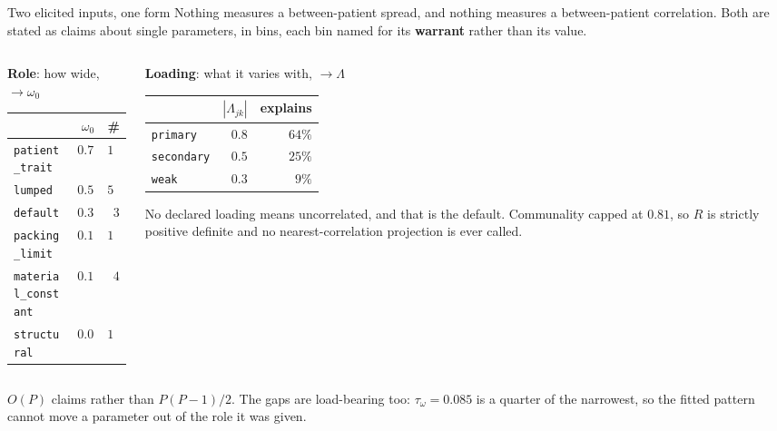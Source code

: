 \documentclass[10pt,aspectratio=169]{beamer}
\newcommand{\term}[1]{\alert{\textbf{#1}}}
\begin{document}
\begin{frame}[t]{Two elicited inputs, one form}
  Nothing measures a between-patient spread, and nothing measures a
  between-patient correlation. Both are stated as claims about single parameters,
  in bins, each bin named for its \term{warrant} rather than its value.
  \vspace{0.2em}
  \begin{columns}[t]
    \begin{column}{0.53\textwidth}
      {\small\textbf{Role}: how wide, $\to \omega_0$\par}
      \begin{center}\scriptsize
      \begin{tabular}{@{}lrr@{}}
        \toprule
        & $\omega_0$ & \# \\
        \midrule
        \texttt{patient\_trait} & $0.70$ & $18$ \\
        \texttt{lumped} & $0.50$ & $50$ \\
        \texttt{default} & $0.35$ & $3$ \\
        \texttt{packing\_limit} & $0.15$ & $12$ \\
        \texttt{material\_constant} & $0.10$ & $4$ \\
        \texttt{structural} & $0.05$ & $15$ \\
        \bottomrule
      \end{tabular}
      \end{center}
    \end{column}
    \begin{column}{0.43\textwidth}
      {\small\textbf{Loading}: what it varies with, $\to \Lambda$\par}
      \begin{center}\scriptsize
      \begin{tabular}{@{}lrr@{}}
        \toprule
        & $|\Lambda_{jk}|$ & explains \\
        \midrule
        \texttt{primary} & $0.8$ & $64\%$ \\
        \texttt{secondary} & $0.5$ & $25\%$ \\
        \texttt{weak} & $0.3$ & $9\%$ \\
        \bottomrule
      \end{tabular}
      \end{center}
      {\scriptsize No declared loading means uncorrelated, and that is the
       default. Communality capped at $0.81$, so $R$ is strictly positive
       definite and no nearest-correlation projection is ever called.\par}
    \end{column}
  \end{columns}
  \vspace{0.2em}
  {\small $O(P)$ claims rather than $P(P-1)/2$. The gaps are load-bearing too:
   $\tau_\omega=0.085$ is a quarter of the narrowest, so the fitted pattern
   cannot move a parameter out of the role it was given.\par}
\end{frame}
\end{document}
